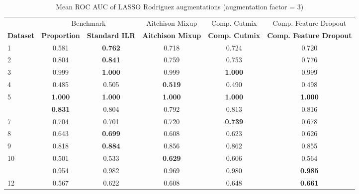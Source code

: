 \begin{table}[!h]
\centering
\caption{\label{tab:tab:rodriguez_lasso_mean_roc_auc_3}Mean ROC AUC of LASSO Rodriguez augmentations (augmentation factor = 3)}
\centering
\begin{tabular}[t]{lccccc}
\toprule
\multicolumn{1}{c}{ } & \multicolumn{2}{c}{Benchmark} & \multicolumn{1}{c}{Aitchison Mixup} & \multicolumn{1}{c}{Comp. Cutmix} & \multicolumn{1}{c}{Comp. Feature Dropout} \\
\cmidrule(l{3pt}r{3pt}){2-3} \cmidrule(l{3pt}r{3pt}){4-4} \cmidrule(l{3pt}r{3pt}){5-5} \cmidrule(l{3pt}r{3pt}){6-6}
\textbf{Dataset} & \textbf{Proportion} & \textbf{Standard ILR} & \textbf{Aitchison Mixup} & \textbf{Comp. Cutmix} & \textbf{Comp. Feature Dropout}\\
\midrule
1 & 0.581 & \textbf{0.762} & 0.718 & 0.724 & 0.720\\
2 & 0.804 & \textbf{0.841} & 0.759 & 0.753 & 0.776\\
3 & 0.999 & \textbf{1.000} & 0.999 & \textbf{1.000} & 0.999\\
4 & 0.485 & 0.505 & \textbf{0.519} & 0.490 & 0.498\\
5 & \textbf{1.000} & \textbf{1.000} & \textbf{1.000} & \textbf{1.000} & \textbf{1.000}\\
\addlinespace
6 & \textbf{0.831} & 0.804 & 0.792 & 0.813 & 0.816\\
7 & 0.704 & 0.701 & 0.720 & \textbf{0.739} & 0.678\\
8 & 0.643 & \textbf{0.699} & 0.608 & 0.623 & 0.626\\
9 & 0.818 & \textbf{0.884} & 0.856 & 0.862 & 0.855\\
10 & 0.501 & 0.533 & \textbf{0.629} & 0.606 & 0.564\\
\addlinespace
11 & 0.954 & 0.982 & 0.969 & 0.980 & \textbf{0.985}\\
12 & 0.567 & 0.622 & 0.608 & 0.648 & \textbf{0.661}\\
\bottomrule
\end{tabular}
\end{table}
